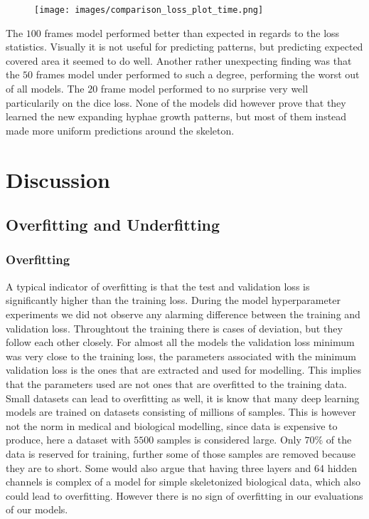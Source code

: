 \documentclass[a4paper,12pt]{article}
\begin{document}
\begin{figure}[H]
  \centering
  \texttt{[image: images/comparison\_loss\_plot\_time.png]}
  \caption{} %
  \label{fig:n28}
\end{figure}
The $100$ frames model performed better than expected in regards to the loss statistics. Visually it is not useful for predicting patterns, but predicting expected covered area it seemed to do well. Another rather unexpecting finding was that the $50$ frames model under performed to such a degree, performing the worst out of all models. The $20$ frame model performed to no surprise very well particularily on the dice loss. None of the models did however prove that they learned the new expanding hyphae growth patterns, but most of them instead made more uniform predictions around the skeleton.
\section{Discussion}

\subsection{Overfitting and Underfitting}
\subsubsection{Overfitting}
A typical indicator of overfitting is that the test and validation loss is significantly higher than the training loss. During the model hyperparameter experiments we did not observe any alarming difference between the training and validation loss. Throughtout the training there is cases of deviation, but they follow each other closely.
For almost all the models the validation loss minimum was very close to the training loss, the parameters associated with the minimum validation loss is the ones that are extracted and used for modelling. This implies that the parameters used are not ones that are overfitted to the training data.
Small datasets can lead to overfitting as well, it is know that many deep learning models are trained on datasets consisting of millions of samples. This is however not the norm in medical and biological modelling, since data is expensive to produce, here a dataset with $5500$ samples is considered large. Only $70\%$ of the data is reserved for training, further some of those samples are removed because they are to short.
Some would also argue that having three layers and 64 hidden channels is complex of a model for simple skeletonized biological data, which also could lead to overfitting. However there is no sign of overfitting in our evaluations of our models.
\end{document}
